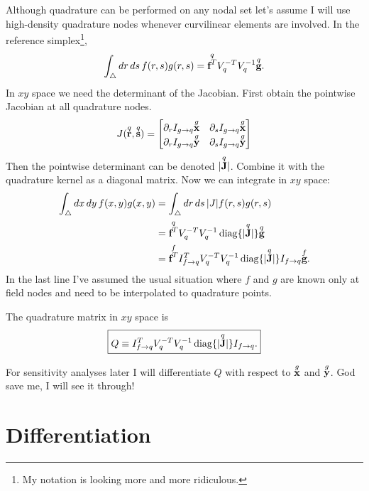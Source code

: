 Although quadrature can be performed on any nodal set let's assume I will use high-density quadrature nodes whenever curvilinear elements are involved.  In the reference simplex\footnote{My notation is looking more and more ridiculous.},
%
\begin{equation}
\int_\bigtriangleup dr\, ds\, f(r,s) g(r,s) = \overset{q}{\textbf{f}^T} V_q^{-T} V_q^{-1} \overset{q}{\textbf{g}}.
\end{equation}
%
In $xy$ space we need the determinant of the Jacobian.  First obtain the pointwise Jacobian at all quadrature nodes.
%
\begin{equation}
J(\overset{q}{\textbf{r}}, \overset{q}{\textbf{s}}) =
\begin{bmatrix}
\partial_r I_{g \rightarrow q} \overset{g}{\textbf{x}} & \partial_s I_{g \rightarrow q} \overset{g}{\textbf{x}} \\
\partial_r I_{g \rightarrow q} \overset{g}{\textbf{y}} & \partial_s I_{g \rightarrow q} \overset{g}{\textbf{y}}
\end{bmatrix}
\end{equation}
%
Then the pointwise determinant can be denoted $| \overset{q}{\textbf{J}} |$.  Combine it with the quadrature kernel as a diagonal matrix.  Now we can integrate in $xy$ space:
%
\begin{equation}
\begin{aligned}
\int_\bigtriangleup dx \, dy \, f(x,y) g(x,y) &= \int_\bigtriangleup dr \, ds \, |J| f(r,s) g(r,s) \\
&= \overset{q}{\textbf{f}^T} V_q^{-T} V_q^{-1} \operatorname{diag}\{| \overset{q}{\textbf{J}}|\} \overset{q}{\textbf{g}} \\
&= \overset{f}{\textbf{f}^T} I_{f \rightarrow q}^T V_q^{-T} V_q^{-1} \operatorname{diag}\{| \overset{q}{\textbf{J}}|\} I_{f \rightarrow q} \overset{f}{\textbf{g}}.
\end{aligned}
\end{equation}
%
In the last line I've assumed the usual situation where $f$ and $g$ are known only at field nodes and need to be interpolated to quadrature points.

The quadrature matrix in $xy$ space is
%
\begin{equation}
\boxed{
Q \equiv I_{f \rightarrow q}^T V_q^{-T} V_q^{-1} \operatorname{diag}\{| \q{\ve J}|\} I_{f \rightarrow q}.
}%
\end{equation}

For sensitivity analyses later I will differentiate $Q$ with respect to $\overset{g}{\textbf{x}}$ and $\overset{g}{\textbf{y}}$.  God save me, I will see it through!

\section{Differentiation}

